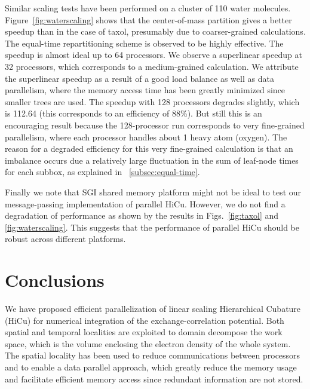 \documentclass[preprint]{revtex4}
\begin{document}
Similar scaling tests have been performed on a cluster of 110 water
molecules.  Figure~\ref{fig:waterscaling} shows that the
center-of-mass partition gives a better speedup than in the case of
taxol, presumably due to coarser-grained calculations.  The equal-time
repartitioning scheme is observed to be highly effective.  The speedup
is almost ideal up to 64 processors. We observe a superlinear speedup
at 32 processors, which corresponds to a medium-grained calculation.
We attribute the superlinear speedup as a result of a good load
balance as well as data parallelism, where the memory access time has been
greatly minimized since smaller trees are used.  The speedup with 128
processors degrades slightly, which is 112.64 (this corresponds to an
efficiency of 88\%).  But still this is an encouraging result because
the 128-processor run corresponds to very fine-grained parallelism,
where each processor handles about 1 heavy atom (oxygen). The reason
for a degraded efficiency for this very fine-grained calculation is
that an imbalance occurs due a relatively large fluctuation in the sum of
leaf-node times for each subbox, as explained in~
\ref{subsec:equal-time}.

Finally we note that SGI shared memory platform might not be ideal to
test our message-passing implementation of parallel HiCu. However, we
do not find a degradation of performance as shown by the results in
Figs.~\ref{fig:taxol} and \ref{fig:waterscaling}. This suggests that
the performance of parallel HiCu should be robust across different
platforms.

\section{Conclusions}
\label{sec:conclusions}

We have proposed efficient parallelization of linear scaling
Hierarchical Cubature (HiCu) for numerical integration of
the exchange-correlation potential.  Both spatial and temporal localities
are exploited to domain decompose the work space, which is the volume
enclosing the electron density of the whole system.  The spatial locality has
been used to reduce communications between processors and to enable a
data parallel approach, which greatly reduce the memory usage and
facilitate efficient memory access since redundant information are not
stored.
\end{document}
